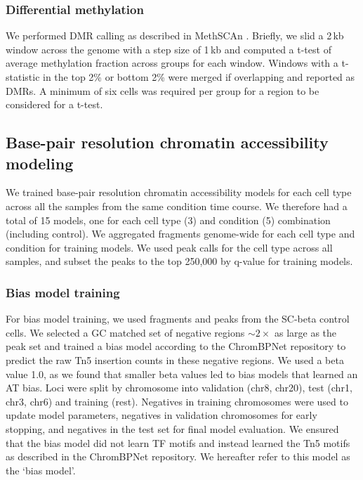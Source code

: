 \subsubsection{Differential methylation}

We performed DMR calling as described in MethSCAn \cite{Kremer2024-pd}. Briefly, we slid a 2\,kb window across the genome with a step size of 1\,kb and computed a t-test of average methylation fraction across groups for each window. Windows with a t-statistic in the top 2\% or bottom 2\% were merged if overlapping and reported as DMRs. A minimum of six cells was required per group for a region to be considered for a t-test.

\subsection*{Base-pair resolution chromatin accessibility modeling}

We trained base-pair resolution chromatin accessibility models for each cell type across all the samples from the same condition time course. We therefore had a total of 15 models, one for each cell type (3) and condition (5) combination (including control). We aggregated fragments genome-wide for each cell type and condition for training models. We used peak calls for the cell type across all samples, and subset the peaks to the top 250,000 by q-value for training models.

\subsubsection*{Bias model training}

For bias model training, we used fragments and peaks from the SC-beta control cells. We selected a GC matched set of negative regions \(\sim2\times\) as large as the peak set and trained a bias model according to the ChromBPNet repository \cite{Pampari2025-lm} to predict the raw Tn5 insertion counts in these negative regions. We used a beta value 1.0, as we found that smaller beta values led to bias models that learned an AT bias. Loci were split by chromosome into validation (chr8, chr20), test (chr1, chr3, chr6) and training (rest). Negatives in training chromosomes were used to update model parameters, negatives in validation chromosomes for early stopping, and negatives in the test set for final model evaluation. We ensured that the bias model did not learn TF motifs and instead learned the Tn5 motifs as described in the ChromBPNet repository. We hereafter refer to this model as the ‘bias model’.

